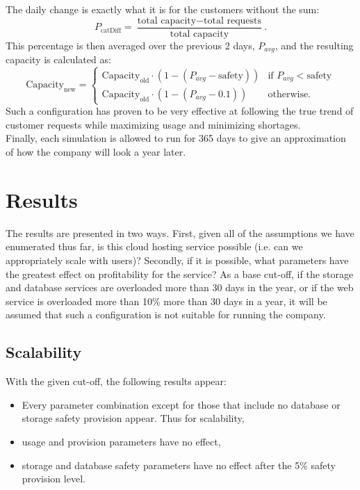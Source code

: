 \documentclass[12pt]{article} %
\begin{document}
    The daily change is exactly what it is for the customers without the sum:
    \[
P_{\text{catDiff}} = \frac{\text{total capacity} - \text{total requests}}{\text{total capacity}}.\]
This percentage is then averaged over the previous 2 days, \(P_{avg}\), and the resulting capacity is calculated as:
\[\text{Capacity}_\text{new} = \begin{cases} \text{Capacity}_\text{old}\cdot (1-(P_{avg}-\text{safety})) & \text{if }P_{avg} < \text{safety}\\
                                             \text{Capacity}_\text{old}\cdot (1-(P_{avg}-0.1)) & \text{otherwise. }\end{cases}\]
Such a configuration has proven to be very effective at following the true trend of customer requests while maximizing usage and minimizing shortages.\\

Finally, each simulation is allowed to run for 365 days to give an approximation of how the company will look a year later.



\section{Results}

The results are presented in two ways.  First, given all of the assumptions we have enumerated thus far, is this cloud hosting service possible (i.e. can we appropriately scale with users)?
Secondly, if it is possible, what parameters have the greatest effect on profitability for the service?
As a base cut-off, if the storage and database services are overloaded more than 30 days in the year, or if the web service is overloaded more than 10\% more than 30 days in a year, it will be assumed that such a configuration is not suitable for running the company.

\subsection{Scalability}
With the given cut-off, the following results appear:

\begin{itemize}
    \item Every parameter combination except for those that include no database or storage safety provision appear.  Thus for scalability,
    \item usage and provision parameters have no effect,
    \item storage and database safety parameters have no effect after the 5\% safety provision level.
\end{itemize}
\end{document}
